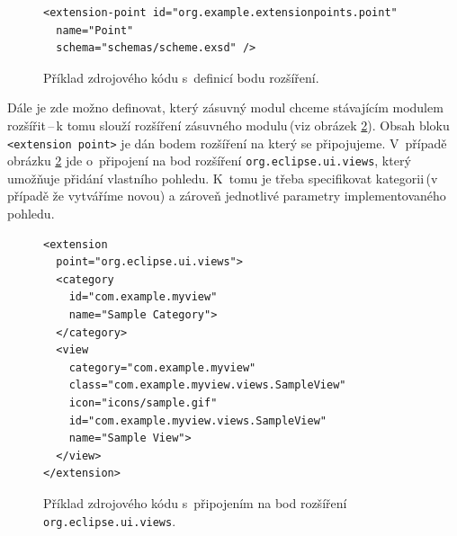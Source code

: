       \lstset{language=xml}
      \begin{figure}
	\begin{lstlisting}[frame=single]
<extension-point id="org.example.extensionpoints.point"
  name="Point"
  schema="schemas/scheme.exsd" />
	\end{lstlisting}
	\caption{Příklad zdrojového kódu s~definicí bodu rozšíření.}
	\label{code:extension_point_declaration}
      \end{figure}

      Dále je zde možno definovat, který zásuvný modul chceme stávajícím modulem rozšířit\,--\,k tomu slouží rozšíření zásuvného modulu\,(viz obrázek \ref{code:extension_declaration}). Obsah bloku \texttt{<extension point>} je dán bodem rozšíření na který se připojujeme. V~případě obrázku \ref{code:extension_declaration} jde o~připojení na bod rozšíření \texttt{org.eclipse.ui.views}, který umožňuje přidání vlastního pohledu. K~tomu je třeba specifikovat kategorii\,(v případě že vytváříme novou) a zároveň jednotlivé parametry implementovaného pohledu.

      \begin{figure}
	\begin{lstlisting}[frame=single]
<extension
  point="org.eclipse.ui.views">
  <category
    id="com.example.myview"
    name="Sample Category">
  </category>
  <view
    category="com.example.myview"
    class="com.example.myview.views.SampleView"
    icon="icons/sample.gif"
    id="com.example.myview.views.SampleView"
    name="Sample View">
  </view>
</extension>
	\end{lstlisting}
	\caption{Příklad zdrojového kódu s~připojením na bod rozšíření \texttt{org.eclipse.ui.views}.}
	\label{code:extension_declaration}
      \end{figure}